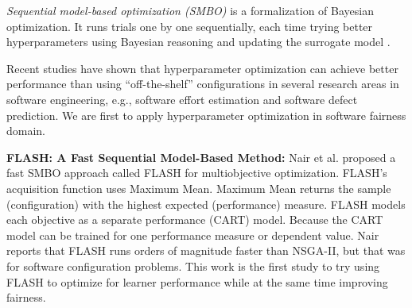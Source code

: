 \documentclass{NSF}
\begin{document}
\begin{nsfdescription}
\textit{Sequential model-based optimization (SMBO)} \cite{10.1007/978-3-642-25566-3_40} is a formalization of Bayesian optimization. It runs trials one by one sequentially, each time trying better hyperparameters using Bayesian reasoning and updating the surrogate model \cite{Will_Koehrsen}.

Recent studies have shown that hyperparameter optimization can achieve better performance than using ``off-the-shelf'' configurations in several research areas in software engineering, e.g., software effort estimation\cite{xia2018hyperparameter} and software defect prediction\cite{osman2017hyperparameter}. We are first to apply hyperparameter optimization in software fairness domain.

\textbf{FLASH: A Fast Sequential Model-Based Method:}
Nair et al. \cite{8469102} proposed a fast SMBO approach called FLASH for multiobjective optimization. FLASH's acquisition function uses Maximum Mean. Maximum Mean returns the sample (configuration) with the highest expected (performance) measure. FLASH models each objective as a separate performance (CART) model. Because the CART model can be trained for one performance measure or dependent value. Nair reports that FLASH runs orders of magnitude faster than NSGA-II, but that was for software configuration problems. This work is the first study to try using  FLASH to optimize for learner performance while at the same time improving fairness.





\end{nsfdescription}
\end{document}
